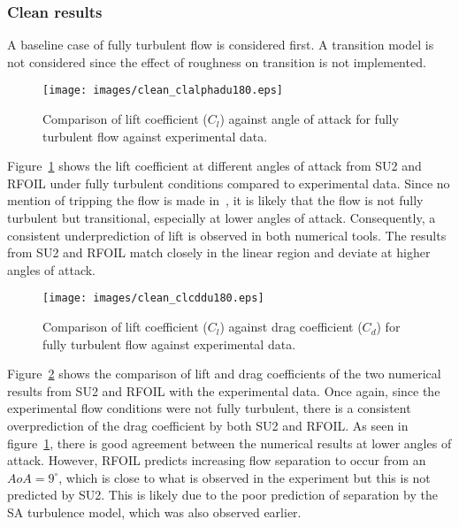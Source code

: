 \subsubsection{Clean results}
A baseline case of fully turbulent flow is considered first. A transition model is not considered since the effect of roughness on transition is not implemented. 
\begin{figure}[h!]
    \centering
    \captionsetup{justification=centering}
    \texttt{[image: images/clean\_clalphadu180.eps]}
    \caption{Comparison of lift coefficient ($C_l$) against angle of attack for fully turbulent flow against experimental data.}
    \label{fig:du180clalclean}
\end{figure}
Figure~\ref{fig:du180clalclean} shows the lift coefficient at different angles of attack from SU2 and RFOIL under fully turbulent conditions compared to experimental data. Since no mention of tripping the flow is made in~\cite{sareen2014effects}, it is likely that the flow is not fully turbulent but transitional, especially at lower angles of attack. Consequently, a consistent underprediction of lift is observed in both numerical tools. The results from SU2 and RFOIL match closely in the linear region and deviate at higher angles of attack.
\begin{figure}[h!]
    \centering
    \captionsetup{justification=centering}
    \texttt{[image: images/clean\_clcddu180.eps]}
    \caption{Comparison of lift coefficient ($C_l$) against drag coefficient ($C_d$) for fully turbulent flow against experimental data.}
    \label{fig:du180clcdclean}
\end{figure}
Figure~\ref{fig:du180clcdclean} shows the comparison of lift and drag coefficients of the two numerical results from SU2 and RFOIL with the experimental data. Once again, since the experimental flow conditions were not fully turbulent, there is a consistent overprediction of the drag coefficient by both SU2 and RFOIL. As seen in figure~\ref{fig:du180clalclean}, there is good agreement between the numerical results at lower angles of attack. However, RFOIL predicts increasing flow separation to occur from an $AoA=9^{\circ}$, which is close to what is observed in the experiment but this is not predicted by SU2. This is likely due to the poor prediction of separation by the SA turbulence model, which was also observed earlier.


